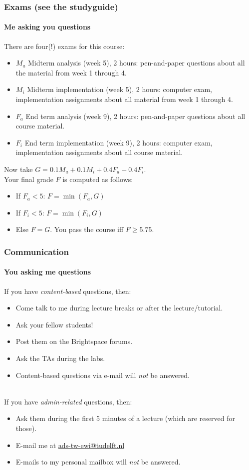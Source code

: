 \begin{frame}
	\frametitle{Exams (see the studyguide)}
	\framesubtitle{Me asking you questions}

	There are four(!) exams for this course:
	\begin{itemize}
		\item $M_a$ Midterm analysis (week 5), 2 hours: pen-and-paper questions about all the material from week 1 through 4.
		\item $M_i$ Midterm implementation (week 5), 2 hours: computer exam, implementation assignments about all material
			from week 1 through 4.
			\pause
		\item $F_a$ End term analysis (week 9), 2 hours: pen-and-paper questions about all course material.
		\item $F_i$ End term implementation (week 9), 2 hours: computer exam, implementation assignments about all course
			material.
	\end{itemize}
			\pause
	Now take $G = 0.1M_a + 0.1M_i +0.4F_a+0.4F_i$.\\
	Your final grade $F$ is computed as follows:
	\begin{itemize}
		\item If $F_a < 5$: $F= \min(F_a, G)$
		\item If $F_i < 5$: $F= \min(F_i, G)$
		\item Else $F=G$. You pass the course iff $F \geq 5.75$.
	\end{itemize}
	
\end{frame}

\begin{frame}
	\frametitle{Communication}
	\framesubtitle{You asking me questions}

	If you have \textit{content-based} questions, then:
	\begin{itemize}
		\item Come talk to me during lecture breaks or after the lecture/tutorial.
		\item Ask your fellow students!
		\item Post them on the Brightspace forums.
		\item Ask the TAs during the labs.
		\item Content-based questions via e-mail will \textit{not} be answered.
	\end{itemize}

	\hfill\\
	If you have \textit{admin-related} questions, then:
	\begin{itemize}
		\item Ask them during the first 5 minutes of a lecture (which are reserved for those).
		\item E-mail me at \href{mailto:ads-tw-ewi@tudelft.nl}{ads-tw-ewi@tudelft.nl}
		\item E-mails to my personal mailbox will \textit{not} be answered.
	\end{itemize}
\end{frame}

